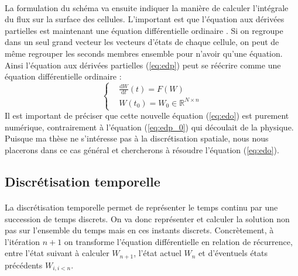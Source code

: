 		\paragraph{}
		La formulation du schéma va ensuite indiquer la manière de calculer l'intégrale du flux sur la surface des cellules.
		L'important est que l'équation aux dérivées partielles est maintenant une équation différentielle ordinaire \cite{TrefethenBirkissonDriscoll2017}.
		Si on regroupe dans un seul grand vecteur les vecteurs d'états de chaque cellule, on peut de même regrouper les seconds membres ensemble pour n'avoir qu'une équation.
		Ainsi l'équation aux dérivées partielles (\ref{eq:edp}) peut se réécrire comme une équation différentielle ordinaire :
		\begin{equation}\label{eq:edo}
			\left\{\begin{aligned}
				&\frac{\mathrm{d}W}{\mathrm{d}t}\left(t\right) = F\left(W\right) \\
				&W\left(t_0\right) = W_0\in\mathbb{R}^{N\times n}
			\end{aligned}\right.
		\end{equation}
		Il est important de préciser que cette nouvelle équation (\ref{eq:edo}) est purement numérique, contrairement à l'équation (\ref{eq:edp_0}) qui découlait de la physique.
		Puisque ma thèse ne s'intéresse pas à la discrétisation spatiale, nous nous placerons dans ce cas général et chercherons à résoudre l'équation (\ref{eq:edo}).

	\subsection{Discrétisation temporelle}

		\paragraph{}
		La discrétisation temporelle permet de représenter le temps continu par une succession de temps discrets.
		On va donc représenter et calculer la solution non pas sur l'ensemble du temps mais en ces instants discrets.
		Concrètement, à l'itération $n+1$ on transforme l'équation différentielle en relation de récurrence, entre l'état suivant à calculer $W_{n+1}$, l'état actuel $W_n$ et d'éventuels états précédents $W_{i,i<n}$.

